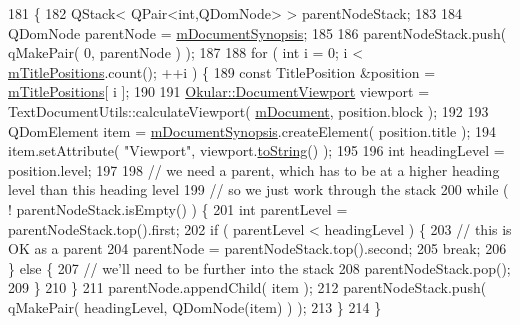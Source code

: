 \begin{DoxyCode}
181 \{
182     QStack< QPair<int,QDomNode> > parentNodeStack;
183 
184     QDomNode parentNode = \hyperlink{classOkular_1_1TextDocumentGeneratorPrivate_aca9fca1479a2577d263d40e93c4960fd}{mDocumentSynopsis};
185 
186     parentNodeStack.push( qMakePair( 0, parentNode ) );
187 
188     \textcolor{keywordflow}{for} ( \textcolor{keywordtype}{int} i = 0; i < \hyperlink{classOkular_1_1TextDocumentGeneratorPrivate_a2facb58407e1b46e1e534956d1b1d46d}{mTitlePositions}.count(); ++i ) \{
189         \textcolor{keyword}{const} TitlePosition &position = \hyperlink{classOkular_1_1TextDocumentGeneratorPrivate_a2facb58407e1b46e1e534956d1b1d46d}{mTitlePositions}[ i ];
190 
191         \hyperlink{classOkular_1_1DocumentViewport}{Okular::DocumentViewport} viewport = TextDocumentUtils::calculateViewport( 
      \hyperlink{classOkular_1_1TextDocumentGeneratorPrivate_abee33b8837b86732e286172de83e110e}{mDocument}, position.block );
192 
193         QDomElement item = \hyperlink{classOkular_1_1TextDocumentGeneratorPrivate_aca9fca1479a2577d263d40e93c4960fd}{mDocumentSynopsis}.createElement( position.title );
194         item.setAttribute( \textcolor{stringliteral}{"Viewport"}, viewport.\hyperlink{classOkular_1_1DocumentViewport_a77e42e0c9502b91085cd25f845ecafa0}{toString}() );
195 
196         \textcolor{keywordtype}{int} headingLevel = position.level;
197 
198         \textcolor{comment}{// we need a parent, which has to be at a higher heading level than this heading level}
199         \textcolor{comment}{// so we just work through the stack}
200         \textcolor{keywordflow}{while} ( ! parentNodeStack.isEmpty() ) \{
201             \textcolor{keywordtype}{int} parentLevel = parentNodeStack.top().first;
202             \textcolor{keywordflow}{if} ( parentLevel < headingLevel ) \{
203                 \textcolor{comment}{// this is OK as a parent}
204                 parentNode = parentNodeStack.top().second;
205                 \textcolor{keywordflow}{break};
206             \} \textcolor{keywordflow}{else} \{
207                 \textcolor{comment}{// we'll need to be further into the stack}
208                 parentNodeStack.pop();
209             \}
210         \}
211         parentNode.appendChild( item );
212         parentNodeStack.push( qMakePair( headingLevel, QDomNode(item) ) );
213     \}
214 \}
\end{DoxyCode}
